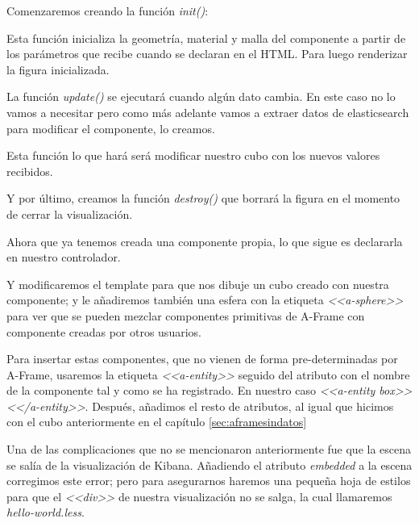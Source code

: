 \documentclass[a4paper, 12pt]{book}
\begin{document}
Comenzaremos creando la función \textit{init()}:



Esta función inicializa la geometría, material y malla del componente a partir de los parámetros que recibe cuando se declaran en el HTML. Para luego renderizar la figura inicializada.

La función \textit{update()} se ejecutará cuando algún dato cambia. En este caso no lo vamos a necesitar pero como más adelante vamos a extraer datos de elasticsearch para modificar el componente, lo creamos.



Esta función lo que hará será modificar nuestro cubo con los nuevos valores recibidos.

Y por último, creamos la función \textit{destroy()} que borrará la figura en el momento de cerrar la visualización.



Ahora que ya tenemos creada una componente propia, lo que sigue es declararla en nuestro controlador.



Y modificaremos el template para que nos dibuje un cubo creado con nuestra componente; y le añadiremos también una esfera con la etiqueta \textit{<<a-sphere>>} para ver que se pueden mezclar componentes primitivas de A-Frame con componente creadas por otros usuarios. 

Para insertar estas componentes, que no vienen de forma pre-determinadas por A-Frame, usaremos la etiqueta \textit{<<a-entity>>} seguido del atributo con el nombre de la componente tal y como se ha registrado. En nuestro caso \textit{<<a-entity box>><</a-entity>>}. Después, añadimos el resto de atributos, al igual que hicimos con el cubo anteriormente en el capítulo \ref{sec:aframesindatos}



Una de las complicaciones que no se mencionaron anteriormente fue que la escena se salía de la visualización de Kibana. Añadiendo el atributo \textit{embedded} a la escena corregimos este error; pero para asegurarnos haremos una pequeña hoja de estilos para que el \textit{<<div>>} de nuestra visualización no se salga, la cual llamaremos \textit{hello-world.less}.
\end{document}
